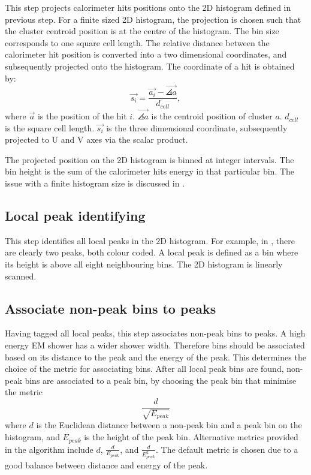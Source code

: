 This step projects calorimeter hits positions onto the 2D histogram defined in previous step. For a finite sized 2D histogram, the projection is chosen such that the cluster centroid position is at the centre of the histogram. The bin size corresponds to one \ECAL square cell length. The relative distance between the calorimeter hit position is converted into a two dimensional coordinates, and subsequently projected onto the histogram. The coordinate of a hit is obtained by:
\begin{equation}
\vec{s_{i}} = \frac{\vec{a_{i}} -  \vec{\angles{a}}}{d_{cell}},
\end{equation}
where $\vec{a}$ is the position of the hit $i$.  $\vec{\angles{a}}$ is the centroid position of cluster $a$. $d_{cell}$ is the  \ECAL square cell length. $\vec{s_{i}}$ is the three dimensional coordinate, subsequently projected to U and V axes via the scalar product.

The projected position on the 2D histogram is binned at integer intervals. The bin height is the sum of the calorimeter hits energy in that particular bin. The issue with a finite histogram size is discussed in .

\subsection{Local peak identifying}

This step identifies all local peaks in the 2D histogram. For example, in , there are clearly two peaks, both colour coded. A local peak is defined as a bin where its height is above all eight neighbouring bins. The 2D histogram is linearly scanned. %

\subsection{Associate non-peak bins to peaks}

Having tagged all local peaks, this step associates non-peak bins to peaks. A high energy EM shower has a wider shower width. Therefore bins should be associated based on its distance to the peak and the energy of the peak. This determines the choice of the metric for associating bins. After all local peak bins are found, non-peak bins are associated to a peak bin, by choosing the peak bin that minimise the metric
\begin{equation}
\frac{d}{\sqrt{E_{peak}}}
\end{equation}
where $d$ is the Euclidean distance between a non-peak bin and a peak bin on the histogram, and $E_{peak}$ is the height of the peak bin. Alternative metrics provided in the algorithm include $d$, $\frac{d}{{E_{peak}}}$, and $\frac{d}{{E_{peak}^2}}$. The default metric is chosen due to a good balance between distance and energy of the peak.


